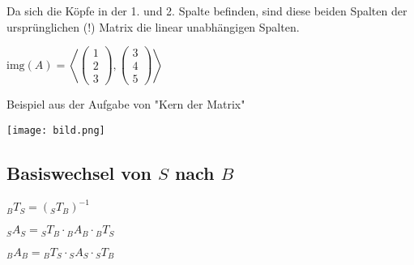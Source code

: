 \begin{multicols*}{3}
    {Da sich die Köpfe in der 1. und 2. Spalte befinden, sind diese beiden Spalten der ursprünglichen (!) Matrix die linear unabhängigen Spalten.}



    { $\text{img}(A) = \left\langle \begin{pmatrix} 1 \\ 2 \\ 3 \end{pmatrix}, \begin{pmatrix} 3 \\ 4 \\ 5 \end{pmatrix} \right\rangle$}

    Beispiel aus der Aufgabe von "Kern der Matrix"

    {\texttt{[image: bild.png]}}

    \subsection{Basiswechsel von $S$ nach $B$}

    ${}_{B}T_{S} = ({}_{S}T_{B})^{-1}$

    ${}_{S}A_{S} = {}_{S}T_{B} \cdot {}_{B}A_{B} \cdot {}_{B}T_{S}$

    ${}_{B}A_{B} = {}_{B}T_{S}  \cdot {}_{S}A_{S} \cdot {}_{S}T_{B}$



\end{multicols*}





